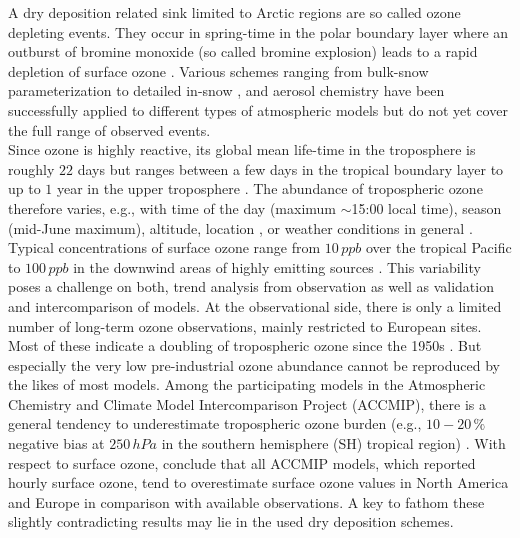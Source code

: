 \documentclass[gmd, manuscript]{copernicus}
\begin{document}
A dry deposition related sink limited to Arctic regions are so called ozone depleting events. They occur in spring-time in the polar boundary layer where an outburst of bromine monoxide  (so called bromine explosion) leads to a rapid depletion of surface ozone \citep{JGR:Oltmans1981,GRL:Bottenheim1986,Nat:Barrie1988,JGR:Bottenheim2006}. Various schemes ranging from bulk-snow parameterization \citep{ACP:Toyota2011,GMD:Falk2018} to detailed in-snow \citep{ACP:Toyota2014a}, and aerosol chemistry \citep{ACP:Yang2010} have been successfully applied to different types of atmospheric models but do not yet cover the full range of observed events.\\
Since ozone is highly reactive, its global mean life-time in the troposphere is roughly $22$ days but ranges between a few days in the tropical boundary layer to up to $1$ year in the upper troposphere \citep{JGR:Stevenson2005,ACP:Young2013}. The abundance of tropospheric ozone therefore varies, e.g., with time of the day (maximum $\sim$15:00 local time), season (mid-June maximum), altitude, location \citep{ACP:Schnell2015}, or weather conditions in general \citep{ACP:Otero2018}. Typical concentrations of surface ozone range from $10\,\unit{ppb}$ over the tropical Pacific to $100\,\unit{ppb}$ in the downwind areas of highly emitting sources \citep[Chapter 8]{IPCC2013}. This variability poses a challenge on both, trend analysis from observation as well as validation and intercomparison of models. At the observational side, there is only a limited number of long-term ozone observations, mainly restricted to European sites. Most of these indicate a doubling of tropospheric ozone since the 1950s \citep[Chapter 2]{IPCC2013}. But especially the very low pre-industrial ozone abundance cannot be reproduced by the likes of most models. Among the participating models in the Atmospheric Chemistry and Climate Model Intercomparison Project (ACCMIP), there is a general tendency to underestimate tropospheric ozone burden (e.g., $10-20\,\unit{\%}$ negative bias at $250\,\unit{hPa}$ in the southern hemisphere (SH) tropical region) \citep[Chapter 8]{IPCC2013}. With respect to surface ozone, \citet{ACP:Schnell2015} conclude that all ACCMIP models, which reported hourly surface ozone, tend to overestimate surface ozone values in North America and Europe in comparison with available observations. A key to fathom these slightly contradicting results may lie in the used dry deposition schemes.\\
\end{document}
